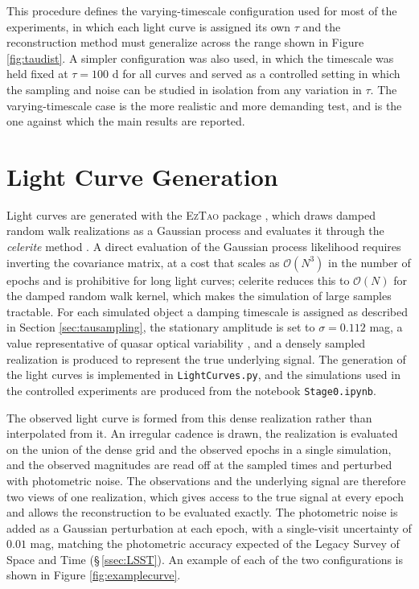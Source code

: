 This procedure defines the varying-timescale configuration used for most of the experiments, in which each light curve is assigned its own $\tau$ and the reconstruction method must generalize across the range shown in Figure \ref{fig:taudist}. A simpler configuration was also used, in which the timescale was held fixed at $\tau = 100$ d for all curves and served as a controlled setting in which the sampling and noise can be studied in isolation from any variation in $\tau$. The varying-timescale case is the more realistic and more demanding test, and is the one against which the main results are reported.


\section{Light Curve Generation}
\label{sec:framework}

Light curves are generated with the \textsc{EzTao} package \parencite{Yu2022Extao}, which draws damped random walk realizations as a Gaussian process and evaluates it through the \textit{celerite} method \parencite{ForemanMackey2017Celerite}. A direct evaluation of the Gaussian process likelihood requires inverting the covariance matrix, at a cost that scales as $\mathcal{O}(N^{3})$ in the number of epochs and is prohibitive for long light curves; celerite reduces this to $\mathcal{O}(N)$ for the damped random walk kernel, which makes the simulation of large samples tractable. For each simulated object a damping timescale is assigned as described in Section \ref{sec:tausampling}, the stationary amplitude is set to $\sigma = 0.112$ mag, a value representative of quasar optical variability \parencite{Yu2025ScalableEztao}, and a densely sampled realization is produced to represent the true underlying signal. The generation of the light curves is implemented in \texttt{LightCurves.py}, and the simulations used in the controlled experiments are produced from the notebook \texttt{Stage0.ipynb}.

The observed light curve is formed from this dense realization rather than interpolated from it. An irregular cadence is drawn, the realization is evaluated on the union of the dense grid and the observed epochs in a single simulation, and the observed magnitudes are read off at the sampled times and perturbed with photometric noise. The observations and the underlying signal are therefore two views of one realization, which gives access to the true signal at every epoch and allows the reconstruction to be evaluated exactly. The photometric noise is added as a Gaussian perturbation at each epoch, with a single-visit uncertainty of $0.01$ mag, matching the photometric accuracy expected of the Legacy Survey of Space and Time (\S\,\ref{ssec:LSST}). An example of each of the two configurations is shown in Figure \ref{fig:examplecurve}.

